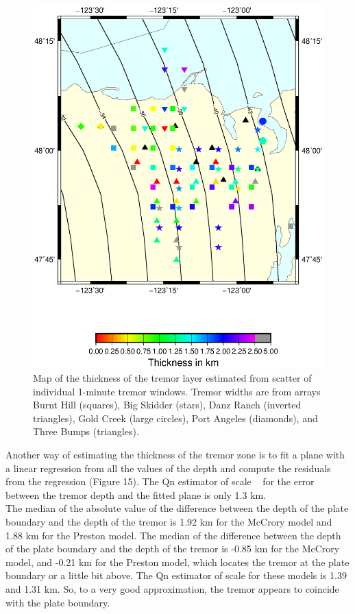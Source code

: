 \documentclass[draft]{agujournal2019}
\begin{document}
\begin{figure}
\noindent\includegraphics[width=\textwidth, trim={1cm 5cm 3.5cm 4cm},clip]{figures/Q_PWS_PWS.eps}
\caption{Map of the thickness of the tremor layer estimated from scatter of individual 1-minute tremor windows. Tremor widths are from arrays Burnt Hill (squares), Big Skidder (stars), Danz Ranch (inverted triangles),  Gold Creek (large circles), Port Angeles (diamonds), and Three Bumps (triangles).}
\label{pngfiguresample}
\end{figure}

Another way of estimating the thickness of the tremor zone is to fit a plane with a linear regression from all the values of the depth and compute the residuals from the regression (Figure 15). The Qn estimator of scale ~\cite{ROU_1993} for the error between the tremor depth and the fitted plane is only 1.3 km. \\

The median of the absolute value of the difference between the depth of the plate boundary and the depth of the tremor is 1.92 km for the McCrory model and 1.88 km for the Preston model. The median of the difference between the depth of the plate boundary and the depth of the tremor is -0.85 km for the McCrory model, and -0.21 km for the Preston model, which locates the tremor at the plate boundary or a little bit above. The Qn estimator of scale for these models is 1.39 and 1.31 km. So, to a very good approximation,  the tremor appears to coincide with the plate boundary. \\
\end{document}
